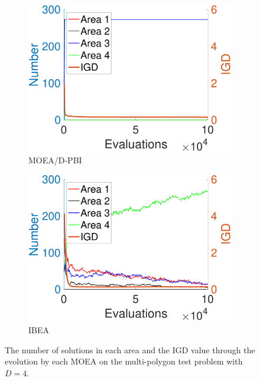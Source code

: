 \documentclass[conference]{IEEEtran}
\begin{document}
\begin{figure}[t!]
\begin{subfigure}[b]{.24\textwidth}
    \end{subfigure}
    \begin{subfigure}[b]{.24\textwidth}
    \includegraphics[width=\linewidth]{Section5/dim4/Diversity/MOEAD_PBI}
    \caption{MOEA/D-PBI}
    \end{subfigure}
    \begin{subfigure}[b]{.24\textwidth}
    \includegraphics[width=\linewidth]{Section5/dim4/Diversity/IBEA}
    \caption{IBEA}
    \end{subfigure}

    \caption{The number of solutions in each area and the IGD value through the evolution by each MOEA on the multi-polygon test problem with $D=4$.}
    \label{fig: MOEAs Diversity dim=4}
\end{figure}
\end{document}
